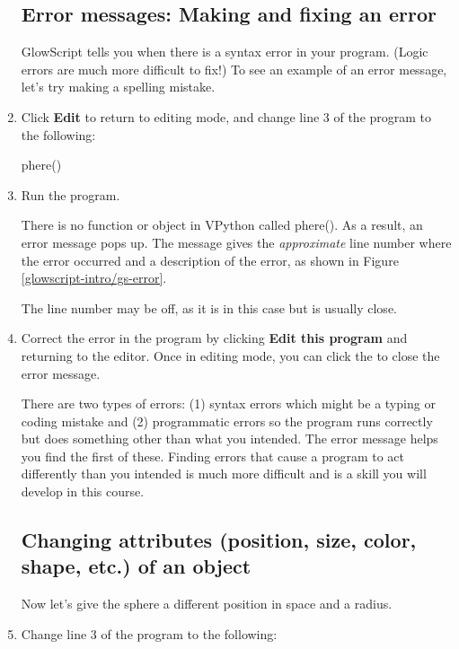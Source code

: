 \begin{enumerate}
	\subsection*{Error messages: Making and fixing an error}
	
	GlowScript tells you when there is a syntax error in  your program. (Logic errors are much more difficult to fix!) To see an example of an error message, let's try making a spelling mistake.
	
	\item Click {\bf Edit} to return to editing mode, and change line 3 of the program to the following:
	
\begin{myvpython}
phere()
\end{myvpython}

	\item Run the program.

There is no function or object in VPython called phere(). As a result, an error message pops up. The message gives the \emph{approximate} line number where the error occurred and a description of the error, as shown in Figure \ref{glowscript-intro/gs-error}.


The line number may be off, as it is in this case but is usually close.

	\item Correct the error in the program by clicking {\bf Edit this program} and returning to the editor. Once in editing mode, you can click the  to close the error message.

There are two types of errors: (1) syntax errors which might be a typing or coding mistake and (2) programmatic errors so the program runs correctly but does something other than what you intended. The error message helps you find the first of these. Finding errors that cause a program to act differently than you intended is much more difficult and is a skill you will develop in this course.
	
	\subsection*{Changing attributes (position, size, color, shape, etc.) of an object}
	
Now let's give the sphere a different position in space and a radius. 

	\item Change line 3 of the program to the following:


\end{enumerate}
